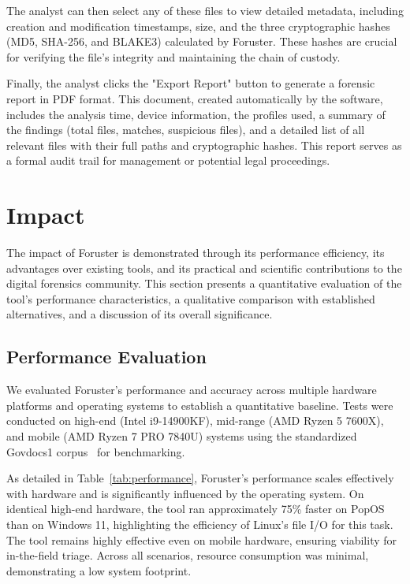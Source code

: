 \documentclass[preprint,12pt,a4paper]{elsarticle}
\begin{document}
The analyst can then select any of these files to view detailed metadata, including creation and modification timestamps, size, and the three cryptographic hashes (MD5, SHA-256, and BLAKE3) calculated by Foruster. These hashes are crucial for verifying the file's integrity and maintaining the chain of custody.

Finally, the analyst clicks the "Export Report" button to generate a forensic report in PDF format. This document, created automatically by the software, includes the analysis time, device information, the profiles used, a summary of the findings (total files, matches, suspicious files), and a detailed list of all relevant files with their full paths and cryptographic hashes. This report serves as a formal audit trail for management or potential legal proceedings.

\section{Impact}

The impact of Foruster is demonstrated through its performance efficiency, its advantages over existing tools, and its practical and scientific contributions to the digital forensics community. This section presents a quantitative evaluation of the tool's performance characteristics, a qualitative comparison with established alternatives, and a discussion of its overall significance.

\subsection{Performance Evaluation}

We evaluated Foruster's performance and accuracy across multiple hardware platforms and operating systems to establish a quantitative baseline. Tests were conducted on high-end (Intel i9-14900KF), mid-range (AMD Ryzen 5 7600X), and mobile (AMD Ryzen 7 PRO 7840U) systems using the standardized Govdocs1 corpus~\cite{garfinkel2009} for benchmarking.

As detailed in Table~\ref{tab:performance}, Foruster's performance scales effectively with hardware and is significantly influenced by the operating system. On identical high-end hardware, the tool ran approximately 75\% faster on PopOS than on Windows 11, highlighting the efficiency of Linux's file I/O for this task. The tool remains highly effective even on mobile hardware, ensuring viability for in-the-field triage. Across all scenarios, resource consumption was minimal, demonstrating a low system footprint.
\end{document}
